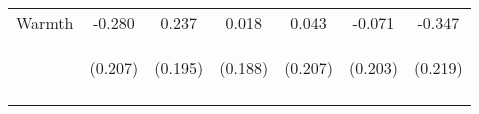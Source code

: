 \begin{tabular}{lcccccc}
\noalign{\smallskip}Warmth & -0.280 & 0.237 & 0.018 & 0.043 & -0.071 & -0.347\\
 & \begin{footnotesize}(0.207)\end{footnotesize} & \begin{footnotesize}(0.195)\end{footnotesize} & \begin{footnotesize}(0.188)\end{footnotesize} & \begin{footnotesize}(0.207)\end{footnotesize} & \begin{footnotesize}(0.203)\end{footnotesize} & \begin{footnotesize}(0.219)\end{footnotesize}\\
\noalign{\smallskip}\hline\end{tabular}\\
